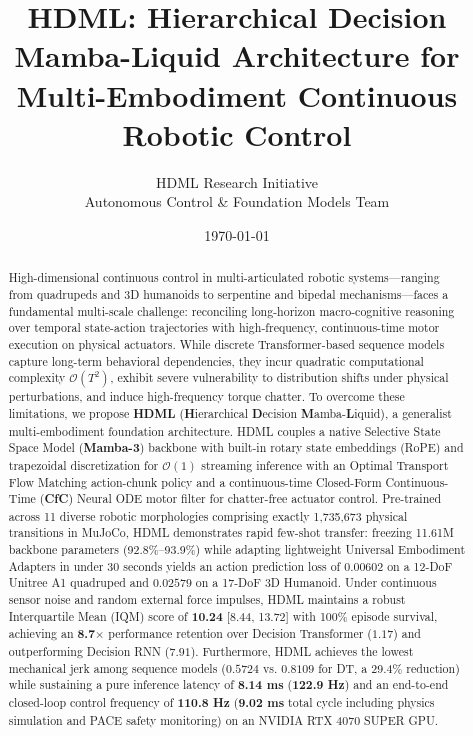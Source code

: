 \documentclass{article}
\title{HDML: Hierarchical Decision Mamba-Liquid Architecture for Multi-Embodiment Continuous Robotic Control}
\author{
  HDML Research Initiative \\
  Autonomous Control \& Foundation Models Team \\
}
\date{\today}
\begin{document}
\maketitle

\begin{abstract}
High-dimensional continuous control in multi-articulated robotic systems---ranging from quadrupeds and 3D humanoids to serpentine and bipedal mechanisms---faces a fundamental multi-scale challenge: reconciling long-horizon macro-cognitive reasoning over temporal state-action trajectories with high-frequency, continuous-time motor execution on physical actuators. While discrete Transformer-based sequence models capture long-term behavioral dependencies, they incur quadratic computational complexity $\mathcal{O}(T^2)$, exhibit severe vulnerability to distribution shifts under physical perturbations, and induce high-frequency torque chatter. To overcome these limitations, we propose \textbf{HDML} (\textbf{H}ierarchical \textbf{D}ecision \textbf{M}amba-\textbf{L}iquid), a generalist multi-embodiment foundation architecture. HDML couples a native Selective State Space Model (\textbf{Mamba-3}) backbone with built-in rotary state embeddings (RoPE) and trapezoidal discretization for $\mathcal{O}(1)$ streaming inference with an Optimal Transport Flow Matching action-chunk policy and a continuous-time Closed-Form Continuous-Time (\textbf{CfC}) Neural ODE motor filter for chatter-free actuator control. Pre-trained across 11 diverse robotic morphologies comprising exactly 1,735,673 physical transitions in MuJoCo, HDML demonstrates rapid few-shot transfer: freezing 11.61M backbone parameters (92.8\%--93.9\%) while adapting lightweight Universal Embodiment Adapters in under 30 seconds yields an action prediction loss of $0.00602$ on a 12-DoF Unitree A1 quadruped and $0.02579$ on a 17-DoF 3D Humanoid. Under continuous sensor noise and random external force impulses, HDML maintains a robust Interquartile Mean (IQM) score of \textbf{10.24} [8.44, 13.72] with 100\% episode survival, achieving an \textbf{8.7$\times$} performance retention over Decision Transformer ($1.17$) and outperforming Decision RNN ($7.91$). Furthermore, HDML achieves the lowest mechanical jerk among sequence models ($0.5724$ vs. $0.8109$ for DT, a 29.4\% reduction) while sustaining a pure inference latency of \textbf{8.14 ms} (\textbf{122.9 Hz}) and an end-to-end closed-loop control frequency of \textbf{110.8 Hz} (\textbf{9.02 ms} total cycle including physics simulation and PACE safety monitoring) on an NVIDIA RTX 4070 SUPER GPU.
\end{abstract}
\end{document}
